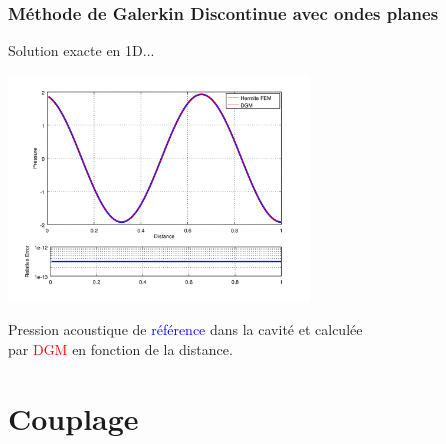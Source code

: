 \documentclass[10pt, compress]{beamer}
\begin{document}
\begin{frame}[fragile]
	\frametitle{Méthode de Galerkin Discontinue avec ondes planes}
    \begin{figure}
        \vspace{-0.1\textwidth}
        \begin{tikzpicture}[>=stealth,scale=0.4,transform shape]
        
        \end{tikzpicture}
        \vspace{-0.2\textwidth}
    \end{figure}

	\begin{block}{Solution exacte en 1D...}
		\begin{center}
		\includegraphics[width=0.6\textwidth]{comp_hermiteFEM_dgm.png}

        \footnotesize{Pression acoustique de \textcolor{blue}{référence} dans la cavité et calculée\\
        par \textcolor{red}{DGM} en fonction de la distance.}
		\end{center}
	\end{block}
\end{frame}

\section{Couplage}
\end{document}
